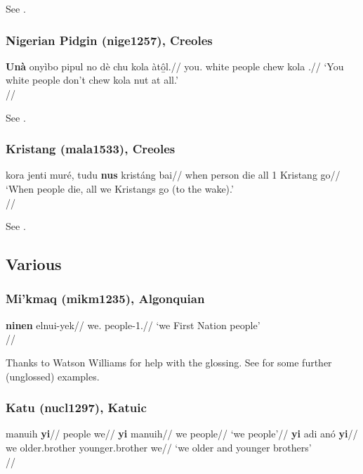 \documentclass[A4paper]{article}
\begin{document}
See \citet[224, 460, 466f.]{huttarhuttar1994}.

\subsubsection{Nigerian Pidgin (nige1257), Creoles}

\ex \begingl
\gla \textbf{Unà} onyìbo pipul no dè chu kola àt\b{ô}l.//
\glb you.\Pl{} white people \Neg{} \Ipfv{} chew kola \Neg.\Emph{}//
\glft `You white people don't chew kola nut at all.'\\\citep[after][181, (802)]{faraclas1996}//
\endgl
\xe

See \citet[178, 181]{faraclas1996}.

\subsubsection{Kristang (mala1533), Creoles}

\ex
\begingl
\gla  kora jenti muré, tudu \textbf{nus} kristáng bai//
\glb when person die all 1\Pl{} Kristang go//
\glft `When people die, all we Kristangs go (to the wake).' \\\citep[after][86, (11)]{baxter1988}//
\endgl
\xe

See \citet[86]{baxter1988}.


\subsection{Various}


\subsubsection{Mi'kmaq (mikm1235), Algonquian}

\ex
\begingl
\gla \textbf{ninen} elnui-yek//
\glb we.\Excl{} people-1\Pl.\Excl//
\glft `we First Nation people'\\
\citep[188]{pacifiqueetal1990}//
\endgl
\xe

Thanks to Watson Williams for help with the glossing.
See \citet[188]{pacifiqueetal1990} for some further (unglossed) examples.

\subsubsection{Katu (nucl1297), Katuic}

\pex
\a \begingl
\gla manuih \textbf{yi}//
\glb people we//
\endgl
\a 
\begingl
\gla \textbf{yi} manuih//
\glb we people//
\glft `we people'//
\endgl
\a
\begingl
\gla \textbf{yi} adi anó \textbf{yi}//
\glb we older.brother younger.brother we//
\glft `we older and younger brothers'\\
\citep[28, (35--37)]{costello1969}//
\endgl
\xe
\end{document}
